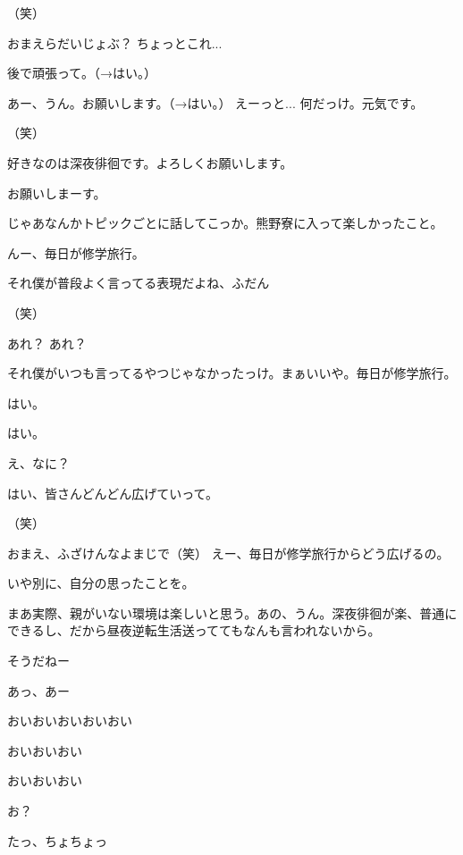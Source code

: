 \begin{multicols}{3}
{        （笑）

        おまえらだいじょぶ？ ちょっとこれ...

        後で頑張って。（→はい。）

        あー、うん。お願いします。（→はい。） えーっと... 何だっけ。元気です。

        （笑）

        好きなのは深夜徘徊です。よろしくお願いします。

        お願いしまーす。

        じゃあなんかトピックごとに話してこっか。熊野寮に入って楽しかったこと。

        んー、毎日が修学旅行。

        それ僕が普段よく言ってる表現だよね、ふだん

        （笑）

        あれ？ あれ？

        それ僕がいつも言ってるやつじゃなかったっけ。まぁいいや。毎日が修学旅行。

        はい。

        はい。

        え、なに？

        はい、皆さんどんどん広げていって。

        （笑）

        おまえ、ふざけんなよまじで（笑） えー、毎日が修学旅行からどう広げるの。

        いや別に、自分の思ったことを。

        まあ実際、親がいない環境は楽しいと思う。あの、うん。深夜徘徊が楽、普通にできるし、だから昼夜逆転生活送っててもなんも言われないから。

        そうだねー

        あっ、あー

        おいおいおいおいおい

        おいおいおい

        おいおいおい

        お？

        たっ、ちょちょっ

}
\end{multicols}
